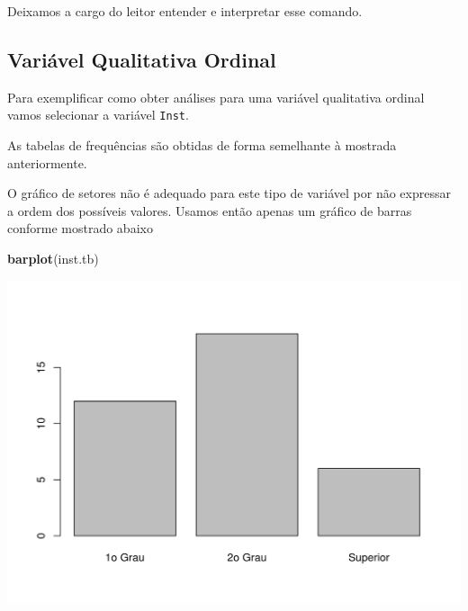 \documentclass[10pt,a4paper]{book}
\newenvironment{Shaded}{\begin{snugshade}}{\end{snugshade}}
\newcommand{\KeywordTok}[1]{\textcolor[rgb]{0.13,0.29,0.53}{\textbf{#1}}}
\newcommand{\DecValTok}[1]{\textcolor[rgb]{0.00,0.00,0.81}{#1}}
\newcommand{\FloatTok}[1]{\textcolor[rgb]{0.00,0.00,0.81}{#1}}
\newcommand{\StringTok}[1]{\textcolor[rgb]{0.31,0.60,0.02}{#1}}
\newcommand{\OperatorTok}[1]{\textcolor[rgb]{0.81,0.36,0.00}{\textbf{#1}}}
\newcommand{\NormalTok}[1]{#1}
\begin{document}
Deixamos a cargo do leitor entender e interpretar esse comando.

\subsection{Variável Qualitativa
Ordinal}\label{variavel-qualitativa-ordinal}

Para exemplificar como obter análises para uma variável qualitativa
ordinal vamos selecionar a variável \texttt{Inst}.

As tabelas de frequências são obtidas de forma semelhante à mostrada
anteriormente.

\begin{Shaded}
\end{Shaded}

O gráfico de setores não é adequado para este tipo de variável por não
expressar a ordem dos possíveis valores. Usamos então apenas um gráfico
de barras conforme mostrado abaixo

\begin{Shaded}
\begin{Highlighting}[]
\KeywordTok{barplot}\NormalTok{(inst.tb)}
\end{Highlighting}
\end{Shaded}

\begin{center}\includegraphics{figures/unnamed-chunk-295-1} \end{center}
\end{document}
